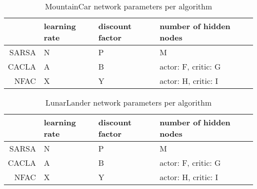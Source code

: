 
\begin{table}
\centering
\label{tab:mntparam}
\begin{tabular}{r|llll}
                     & learning rate & discount factor & number of hidden nodes \\\hline
SARSA & N          & P               & M         \\
CACLA & A          & B               & actor: F, critic: G         \\
NFAC    & X          & Y              & actor: H, critic: I        
\end{tabular}
\caption{MountainCar network parameters per algorithm}
\end{table}

\begin{table}
\centering
\label{tab:lunarparam}
\begin{tabular}{r|llll}
                     & learning rate & discount factor & number of hidden nodes \\\hline
SARSA & N          & P               & M         \\
CACLA & A          & B               & actor: F, critic: G         \\
NFAC    & X          & Y              & actor: H, critic: I        
\end{tabular}
\caption{LunarLander network parameters per algorithm}
\end{table}

